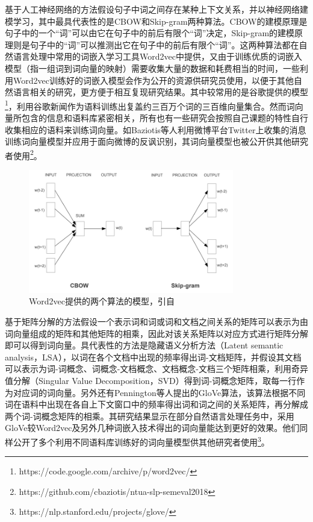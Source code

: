基于人工神经网络的方法假设句子中词之间存在某种上下文关系，并以神经网络建模学习，其中最具代表性的是CBOW和Skip-gram两种算法。CBOW的建模原理是句子中的一个“词”可以由它在句子中的前后有限个“词”决定，Skip-gram的建模原理则是句子中的“词”可以推测出它在句子中的前后有限个“词”。这两种算法都在自然语言处理中常用的词嵌入学习工具Word2vec\cite{mikolov2013efficient}中提供，又由于训练优质的词嵌入模型（指一组词到词向量的映射）需要收集大量的数据和耗费相当的时间，一些利用Word2vec训练好的词嵌入模型会作为公开的资源供研究员使用，以便于其他自然语言相关的研究，更方便于相互复现研究结果。其中较常用的是谷歌提供的模型\footnote{https://code.google.com/archive/p/word2vec/}，利用谷歌新闻作为语料训练出复盖约三百万个词的三百维向量集合。然而词向量所包含的信息和语料库紧密相关，所有也有一些研究会按照自己课题的特性自行收集相应的语料来训练词向量。如Baziotis等人\cite{baziotis2017semeval2}利用微博平台Twitter上收集的消息训练词向量模型并应用于面向微博的反讽识别，其词向量模型也被公开供其他研究者使用\footnote{https://github.com/cbaziotis/ntua-slp-semeval2018}。

\begin{figure}[H]
  \centering
  \includegraphics[width=0.8\textwidth]{img/word2vec.png}
  \caption{Word2vec提供的两个算法的模型，引自\cite{mikolov2013efficient}}
  \label{fig:word2vec}
\end{figure}

基于矩阵分解的方法假设一个表示词和词或词和文档之间关系的矩阵可以表示为由词向量组成的矩阵和其他矩阵的相乘，因此对该关系矩阵以对应方式进行矩阵分解即可以得到词向量。具代表性的方法是隐藏语义分析方法（Latent semantic analysis，LSA）\cite{deerwester1990indexing}，以词在各个文档中出现的频率得出词-文档矩阵，并假设其文档可以表示为词-词概念、词概念-文档概念、文档概念-文档三个矩阵相乘，利用奇异值分解（Singular Value Decomposition，SVD）得到词-词概念矩阵，取每一行作为对应词的词向量。另外还有Pennington等人\cite{pennington2014glove}提出的GloVe算法，该算法根据不同词在语料中出现在各自上下文窗口中的频率得出词和词之间的关系矩阵，再分解成两个词-词概念矩阵的相乘。其研究结果显示在部分自然语言处理任务中，采用GloVe较Word2vec及另外几种词嵌入技术得出的词向量能达到更好的效果。他们同样公开了多个利用不同语料库训练好的词向量模型供其他研究者使用\footnote{https://nlp.stanford.edu/projects/glove/}。

